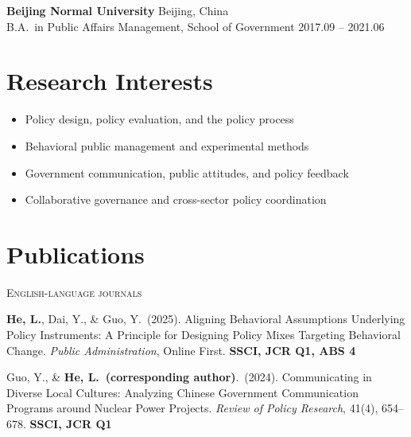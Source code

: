 \documentclass[11pt, a4paper]{article}
\begin{document}
\textbf{Beijing Normal University} \hfill Beijing, China \\
B.A.\ in Public Affairs Management, School of Government
\hfill 2017.09 -- 2021.06

\section{Research Interests}
\begin{itemize}
    \item Policy design, policy evaluation, and the policy process
    \item Behavioral public management and experimental methods
    \item Government communication, public attitudes, and policy feedback
    \item Collaborative governance and cross-sector policy coordination
\end{itemize}

\section{Publications}

\textsc{English-language journals}
\vspace{4pt}
\begin{enumerate}[label={[\arabic*]}]
    \item \textbf{He, L.}, Dai, Y., \& Guo, Y.\ (2025).
    Aligning Behavioral Assumptions Underlying Policy Instruments:
    A Principle for Designing Policy Mixes Targeting Behavioral Change.
    \textit{Public Administration}, Online First.
    \hfill \textbf{SSCI, JCR Q1, ABS 4}

    \item Guo, Y., \& \textbf{He, L.\ (corresponding author)}.\ (2024).
    Communicating in Diverse Local Cultures:
    Analyzing Chinese Government Communication Programs around Nuclear Power Projects.
    \textit{Review of Policy Research}, 41(4), 654--678.
    \hfill \textbf{SSCI, JCR Q1}
\end{enumerate}
\end{document}
